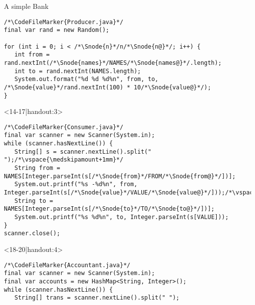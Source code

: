 \begin{frame}[fragile]{A simple Bank}
\begin{onlyenv}
\begin{layout-imageonly}
\begin{onlyenv}
\begin{verbatim}
/*\CodeFileMarker{Producer.java}*/
final var rand = new Random();

for (int i = 0; i < /*\Snode{n}*/n/*\Snode{n@}*/; i++) {
   int from = rand.nextInt(/*\Snode{names}*/NAMES/*\Snode{names@}*/.length);
   int to = rand.nextInt(NAMES.length);
   System.out.format("%d %d %d%n", from, to, /*\Snode{value}*/rand.nextInt(100) * 10/*\Snode{value@}*/);
}
\end{verbatim}
\end{onlyenv}
\begin{onlyenv}<14-17|handout:3>
\begin{verbatim}
/*\CodeFileMarker{Consumer.java}*/
final var scanner = new Scanner(System.in);
while (scanner.hasNextLine()) {
   String[] s = scanner.nextLine().split(" ");/*\vspace{\medskipamount+1mm}*/
   String from = NAMES[Integer.parseInt(s[/*\Snode{from}*/FROM/*\Snode{from@}*/])];
   System.out.printf("%s -%d%n", from, Integer.parseInt(s[/*\Snode{value}*/VALUE/*\Snode{value@}*/]));/*\vspace{\medskipamount+1mm}*/
   String to = NAMES[Integer.parseInt(s[/*\Snode{to}*/TO/*\Snode{to@}*/])];
   System.out.printf("%s %d%n", to, Integer.parseInt(s[VALUE]));
}
scanner.close();
\end{verbatim}
\end{onlyenv}
\begin{onlyenv}<18-20|handout:4>
\begin{verbatim}
/*\CodeFileMarker{Accountant.java}*/
final var scanner = new Scanner(System.in);
final var accounts = new HashMap<String, Integer>();
while (scanner.hasNextLine()) {
   String[] trans = scanner.nextLine().split(" ");


\end{verbatim}
\end{onlyenv}
\end{layout-imageonly}
\end{onlyenv}
\end{frame}
